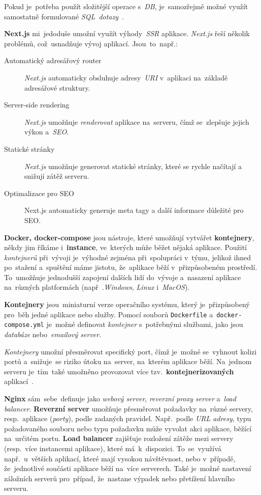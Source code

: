 \documentclass[11pt,a4paper]{report}
\let\oldacrshort\acrshort
\renewcommand{\acrshort}[1]{\emph{\normalsize\color[rgb]{0,0,0}\noindent\oldacrshort{#1}}}
\begin{document}
            Pokud je~potřeba použít složitější operace s~\acrshort{DB}, je~samozřejmě možné využít samostatně formulované \emph{SQL~dotazy}~\cite{gormGORM, freecodecamp:orm}.

            \textbf{Next.js} mi~jedoduše umožní využít výhody~\acrshort{SSR} aplikace. \emph{Next.js} řeší několik problémů, což~usnadňuje vývoj aplikací. Jsou~to~např.:

            \begin{description}
                \item[Automatický adresářový router] \emph{Next.js} automaticky obsluhuje adresy~\acrshort{URI} v~aplikaci na~základě adresářové struktury.
                \item[Server-side rendering] \emph{Next.js} umožňuje \emph{renderovat} aplikace na~serveru, čímž se~zlepšuje jejich výkon a~\acrshort{SEO}.
                \item[Statické stránky] \emph{Next.js} umožňuje generovat statické stránky, které se rychle načítají a snižují zátěž serveru.
                \item[Optimalizace pro SEO] Next.js automaticky generuje meta tagy a další informace důležité pro SEO.
            \end{description}

            \textbf{Docker, docker-compose} jsou nástroje, které umožňují vytvářet \textbf{kontejnery}, někdy jim říkáme i~\textbf{instance}, ve~kterých může běžet nějaká aplikace. Použití \emph{kontejnerů} při~vývoji je~výhodné zejména při~spolupráci v~týmu, jelikož ihned po~stažení a~spuštění máme jistotu, že~aplikace běží v~přizpůsobeném prostředí. To~umožňuje jednodušší zapojení dalších lidí do~vývoje a~nasazení aplikace na~různých platformách (např~.\emph{Windows}, \emph{Linux} i~\emph{MacOS}).

            \textbf{Kontejnery} jsou~miniaturní verze operačního systému, který je~přizpůsobený pro~běh jedné aplikace nebo služby. Pomocí souborů \texttt{Dockerfile} a~\texttt{docker-compose.yml} je~možné definovat \emph{kontejner} s~potřebnými službami, jako jsou \emph{databáze} nebo~\emph{emailový server}.

            \emph{Kontejnery} umožní přesměrovat specifický port, čímž je~možné se~vyhnout kolizi portů a~snižuje~se riziko útoku na~server, na~kterém aplikace běží. Na~jednom serveru je~tím~také umožněno provozovat více tzv.~\textbf{kontejnerizovaných} aplikací~\cite{docker, dockernginxperformance}.

            \textbf{Nginx} sám~sebe~definuje jako \emph{webový server}, \emph{reverzní proxy server} a~\emph{load balancer}. \textbf{Reverzní server} umožňuje přesměrovat požadavky na~různé servery, resp.~aplikace (\emph{porty}), podle zadaných pravidel. Např.~podle \emph{URL adresy}, typu požadovaného souboru nebo typu požadavku může vyvolat akci aplikace, běžící na~určitém portu. \textbf{Load balancer} zajišťuje rozložení zátěže mezi servery (resp.~více instancemi aplikace), které má~k~dispozici. To~se~využívá např.~u~větších aplikací, které mají vysokou návštěvnost, nebo v~případě, že~jednotlivé součásti aplikace běží na~více serverech. Také je~možné nastavení záložních serverů pro~případ, že~nastane výpadek nebo přetížení hlavního serveru.
            
\end{document}

